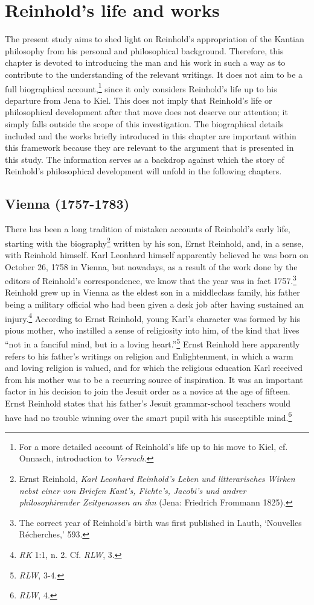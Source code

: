 
\chapter{Reinhold's life and works}


The present study aims to shed light on Reinhold's appropriation of the Kantian philosophy from his personal and philosophical background. Therefore, this chapter is devoted to introducing the man and his work in such a way as to contribute to the understanding of the relevant writings. It does not aim to be a full biographical account,\footnote{ For a more detailed account of Reinhold's life up to his move to Kiel, cf. Onnasch, introduction to \textit{Versuch}. } since it only considers Reinhold's life up to his departure from Jena to Kiel. This does not imply that Reinhold's life or philosophical development after that move does not deserve our attention; it simply falls outside the scope of this investigation. The biographical details included and the works briefly introduced in this chapter are important within this framework because they are relevant to the argument that is presented in this study. The information serves as a backdrop against which the story of Reinhold's philosophical development will unfold in the following chapters. 


\section{Vienna (1757{-}1783)}


There has been a long tradition of mistaken accounts of Reinhold's early life, starting with the biography\footnote{ Ernst Reinhold, \textit{Karl Leonhard Reinhold's Leben und litterarisches Wirken nebst einer von Briefen Kant's, Fichte's, Jacobi's und andrer philosophirender Zeitgenossen an ihn} (Jena: Friedrich Frommann 1825). } written by his son, Ernst Reinhold, and, in a sense, with Reinhold himself. Karl Leonhard himself apparently believed he was born on October 26, 1758 in Vienna, but nowadays, as a result of the work done by the editors of Reinhold's correspondence, we know that the year was in fact 1757.\footnote{ The correct year of Reinhold's birth was first published in Lauth, `Nouvelles R\'{e}cherches,' 593.} Reinhold grew up in Vienna as the eldest son in a middleclass family, his father being a military official who had been given a desk job after having sustained an injury.\footnote{ \textit{RK} 1:1, n. 2. Cf. \textit{RLW}, 3. } According to Ernst Reinhold, young Karl's character was formed by his pious mother, who instilled a sense of religiosity into him, of the kind that lives ``not in a fanciful mind, but in a loving heart.''\footnote{ \textit{RLW}, 3{-}4. } Ernst Reinhold here apparently refers to his father's writings on religion and Enlightenment, in which a warm and loving religion is valued, and for which the religious education Karl received from his mother was to be a recurring source of inspiration. It was an important factor in his decision to join the Jesuit order as a novice at the age of fifteen. Ernst Reinhold states that his father's Jesuit grammar{-}school teachers would have had no trouble winning over the smart pupil with his susceptible mind.\footnote{ \textit{RLW}, 4.} 

